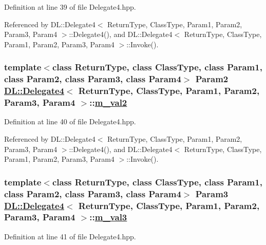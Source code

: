 Definition at line 39 of file Delegate4.hpp.

Referenced by DL::Delegate4$<$ Return\-Type, Class\-Type, Param1, Param2, Param3, Param4 $>$::Delegate4(), and DL::Delegate4$<$ Return\-Type, Class\-Type, Param1, Param2, Param3, Param4 $>$::Invoke().\hypertarget{classDL_1_1Delegate4_r3}{
\subsubsection[m\_\-val2]{\setlength{\rightskip}{0pt plus 5cm}template$<$class Return\-Type, class Class\-Type, class Param1, class Param2, class Param3, class Param4$>$ Param2 \hyperlink{classDL_1_1Delegate4}{DL::Delegate4}$<$ Return\-Type, Class\-Type, Param1, Param2, Param3, Param4 $>$::\hyperlink{classDL_1_1Delegate4_r3}{m\_\-val2}}}
\label{classDL_1_1Delegate4_r3}




Definition at line 40 of file Delegate4.hpp.

Referenced by DL::Delegate4$<$ Return\-Type, Class\-Type, Param1, Param2, Param3, Param4 $>$::Delegate4(), and DL::Delegate4$<$ Return\-Type, Class\-Type, Param1, Param2, Param3, Param4 $>$::Invoke().\hypertarget{classDL_1_1Delegate4_r4}{
\subsubsection[m\_\-val3]{\setlength{\rightskip}{0pt plus 5cm}template$<$class Return\-Type, class Class\-Type, class Param1, class Param2, class Param3, class Param4$>$ Param3 \hyperlink{classDL_1_1Delegate4}{DL::Delegate4}$<$ Return\-Type, Class\-Type, Param1, Param2, Param3, Param4 $>$::\hyperlink{classDL_1_1Delegate4_r4}{m\_\-val3}}}
\label{classDL_1_1Delegate4_r4}




Definition at line 41 of file Delegate4.hpp.

